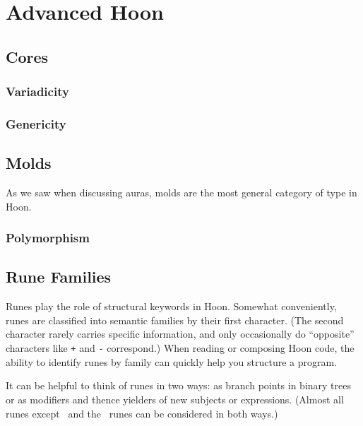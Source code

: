 \setchapterpreamble[u]{\margintoc}
\chapter{Advanced Hoon}


\section{Cores}

\subsection{Variadicity}

\subsection{Genericity}

\section{Molds}

As we saw when discussing auras, molds are the most general category of type in Hoon.


\subsection{Polymorphism}

\section{Rune Families}


Runes play the role of structural keywords in Hoon.  Somewhat conveniently, runes are classified into semantic families by their first character.  (The second character rarely carries specific information, and only occasionally do “opposite” characters like \texttt{+} and \texttt{-} correspond.)  When reading or composing Hoon code, the ability to identify runes by family can quickly help you structure a program.

It can be helpful to think of runes in two ways:  as branch points in binary trees or as modifiers and thence yielders of new subjects or expressions.  (Almost all runes except \pzapzap~and the \psig~runes can be considered in both ways.)

